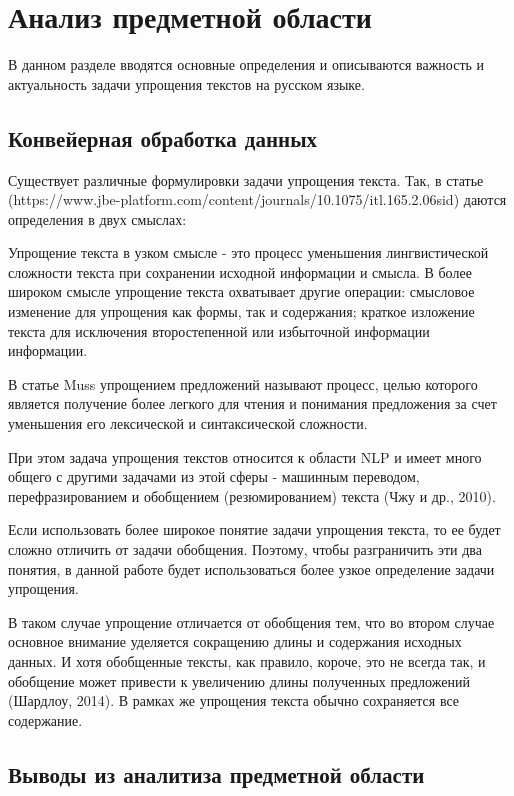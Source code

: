 \chapter{Анализ предметной области}

В данном разделе вводятся основные определения и описываются важность и актуальность задачи упрощения текстов на русском языке.

\section{Конвейерная обработка данных}


Существует различные формулировки задачи упрощения текста. 
Так, в статье (https://www.jbe-platform.com/content/journals/10.1075/itl.165.2.06sid) даются определения в двух смыслах:

Упрощение текста в узком смысле - это процесс уменьшения лингвистической сложности текста при сохранении исходной информации и смысла. 
В более широком смысле упрощение текста охватывает другие операции: смысловое изменение для упрощения как формы, так и содержания; краткое изложение текста для исключения второстепенной или избыточной информации информации.

В статье Muss упрощением предложений называют процесс, целью которого является получение более легкого для чтения и понимания предложения за счет уменьшения его лексической и синтаксической сложности.

При этом задача упрощения текстов относится к области NLP и имеет много общего с другими задачами из этой сферы - машинным переводом, перефразированием и обобщением (резюмированием) текста (Чжу и др., 2010). 

Если использовать более широкое понятие задачи упрощения текста, то ее будет сложно отличить от задачи обобщения. Поэтому, чтобы разграничить эти два понятия, в данной работе будет использоваться более узкое определение задачи упрощения.

В таком случае упрощение отличается от обобщения тем, что во втором случае основное внимание уделяется сокращению длины и содержания исходных данных. И хотя обобщенные тексты, как правило, короче, это не всегда так, и обобщение может привести к увеличению длины полученных предложений (Шардлоу, 2014). В рамках же упрощения текста обычно сохраняется все содержание.



\section{Выводы из аналитиза предметной области}


